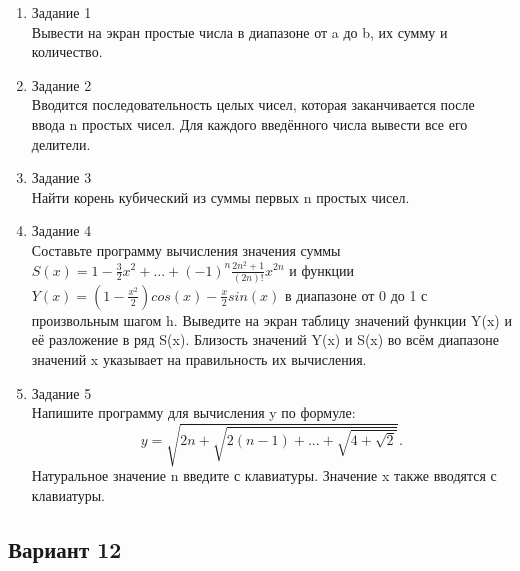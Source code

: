 \documentclass[a4paper]{article}
\begin{document}
	
	\begin{enumerate} 
		\item Задание 1 \\
		Вывести на экран простые числа в диапазоне от a до b, их сумму и количество.\\
		\item Задание 2\\
		Вводится последовательность целых чисел, которая заканчивается после ввода n простых чисел. Для каждого введённого числа вывести все его делители.\\
		\item Задание 3 \\
		Найти корень кубический из суммы первых  n простых чисел.\\
		\item Задание 4 \\ 
		Составьте программу вычисления значения суммы  $S(x)=1-\frac{3}{2}{x^2}+...+(-1)^n\frac{2n^2+1}{(2n)!}{x^{2n}}$
		и функции $Y(x)=(1-\frac{x^2}{2})cos(x)-\frac{x}{2}sin(x)$ в диапазоне от 0 до 1
		с произвольным шагом h. Выведите на экран таблицу значений функции Y(x) и её разложение в ряд S(x). Близость значений Y(x) и S(x) во всём диапазоне
		значений x указывает на правильность их вычисления.\\
		\item Задание 5 \\
		Напишите программу для вычисления y по формуле:\\
		$$y=\sqrt{2n+\sqrt{2(n-1)+...+\sqrt{4+\sqrt{2}}}}.$$
		Натуральное значение n введите с клавиатуры. Значение x также вводятся с клавиатуры.\\
		
	\end{enumerate}

	\begin{center}
		\subsection*{Вариант 12}
	\end{center}
	
\end{document}
